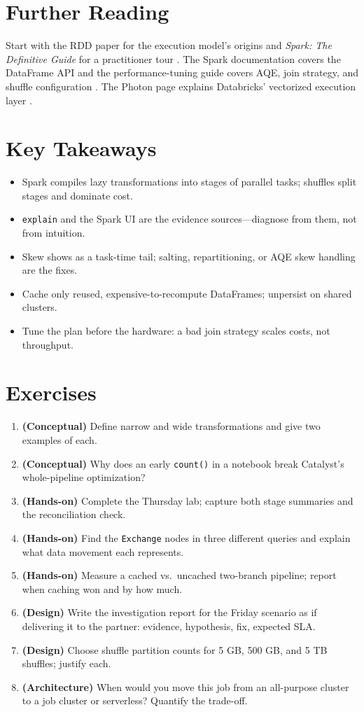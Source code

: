 \section{Further Reading}
Start with the RDD paper for the execution model's origins \cite{zaharia2012spark} and \textit{Spark: The Definitive Guide} for a practitioner tour \cite{chambersZaharia}. The Spark documentation covers the DataFrame API \cite{sparkDocs} and the performance-tuning guide covers AQE, join strategy, and shuffle configuration \cite{sparkSQLTuning}. The Photon page explains Databricks' vectorized execution layer \cite{databricksPhoton}.

\section*{Key Takeaways}
\begin{itemize}
    \item Spark compiles lazy transformations into stages of parallel tasks; shuffles split stages and dominate cost.
    \item \texttt{explain} and the Spark UI are the evidence sources---diagnose from them, not from intuition.
    \item Skew shows as a task-time tail; salting, repartitioning, or AQE skew handling are the fixes.
    \item Cache only reused, expensive-to-recompute DataFrames; unpersist on shared clusters.
    \item Tune the plan before the hardware: a bad join strategy scales costs, not throughput.
\end{itemize}

\section{Exercises}
\begin{enumerate}
    \item \textbf{(Conceptual)} Define narrow and wide transformations and give two examples of each.
    \item \textbf{(Conceptual)} Why does an early \texttt{count()} in a notebook break Catalyst's whole-pipeline optimization?
    \item \textbf{(Hands-on)} Complete the Thursday lab; capture both stage summaries and the reconciliation check.
    \item \textbf{(Hands-on)} Find the \texttt{Exchange} nodes in three different queries and explain what data movement each represents.
    \item \textbf{(Hands-on)} Measure a cached vs.\ uncached two-branch pipeline; report when caching won and by how much.
    \item \textbf{(Design)} Write the investigation report for the Friday scenario as if delivering it to the partner: evidence, hypothesis, fix, expected SLA.
    \item \textbf{(Design)} Choose shuffle partition counts for 5 GB, 500 GB, and 5 TB shuffles; justify each.
    \item \textbf{(Architecture)} When would you move this job from an all-purpose cluster to a job cluster or serverless? Quantify the trade-off.
\end{enumerate}


